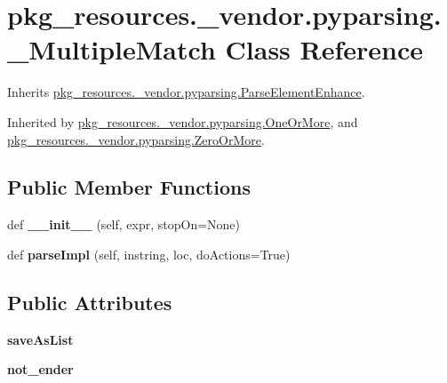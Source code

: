 \hypertarget{classpkg__resources_1_1__vendor_1_1pyparsing_1_1___multiple_match}{}\section{pkg\+\_\+resources.\+\_\+vendor.\+pyparsing.\+\_\+\+Multiple\+Match Class Reference}
\label{classpkg__resources_1_1__vendor_1_1pyparsing_1_1___multiple_match}


Inherits \hyperlink{classpkg__resources_1_1__vendor_1_1pyparsing_1_1_parse_element_enhance}{pkg\+\_\+resources.\+\_\+vendor.\+pyparsing.\+Parse\+Element\+Enhance}.



Inherited by \hyperlink{classpkg__resources_1_1__vendor_1_1pyparsing_1_1_one_or_more}{pkg\+\_\+resources.\+\_\+vendor.\+pyparsing.\+One\+Or\+More}, and \hyperlink{classpkg__resources_1_1__vendor_1_1pyparsing_1_1_zero_or_more}{pkg\+\_\+resources.\+\_\+vendor.\+pyparsing.\+Zero\+Or\+More}.

\subsection*{Public Member Functions}
\begin{DoxyCompactItemize}
\item 
\mbox{\label{classpkg__resources_1_1__vendor_1_1pyparsing_1_1___multiple_match_a4c78811bf28646eef2cd62ff22dc3410}} 
def {\bfseries \+\_\+\+\_\+init\+\_\+\+\_\+} (self, expr, stop\+On=None)
\item 
\mbox{\label{classpkg__resources_1_1__vendor_1_1pyparsing_1_1___multiple_match_afa55e1218db30131a0fb909235422e36}} 
def {\bfseries parse\+Impl} (self, instring, loc, do\+Actions=True)
\end{DoxyCompactItemize}
\subsection*{Public Attributes}
\begin{DoxyCompactItemize}
\item 
\mbox{\label{classpkg__resources_1_1__vendor_1_1pyparsing_1_1___multiple_match_ae775fc868bff417f72a535445862ebdf}} 
{\bfseries save\+As\+List}
\item 
\mbox{\label{classpkg__resources_1_1__vendor_1_1pyparsing_1_1___multiple_match_a7f37e51e12ce6778be64ce30181617a0}} 
{\bfseries not\+\_\+ender}
\end{DoxyCompactItemize}
